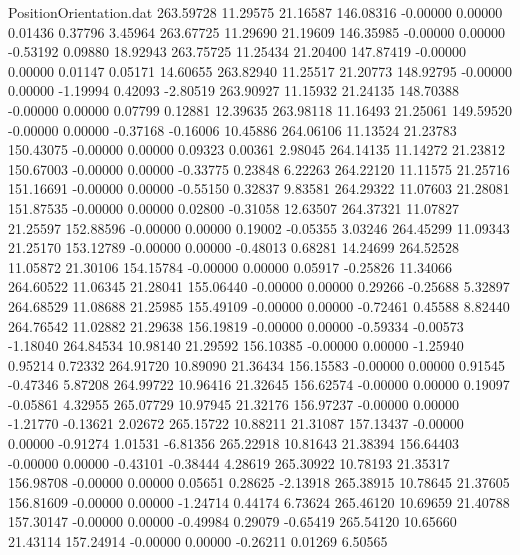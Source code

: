 \begin{filecontents}{PositionOrientation.dat}
 263.59728   11.29575   21.16587   146.08316   -0.00000    0.00000    0.01436    0.37796    3.45964
 263.67725   11.29690   21.19609   146.35985   -0.00000    0.00000   -0.53192    0.09880   18.92943
 263.75725   11.25434   21.20400   147.87419   -0.00000    0.00000    0.01147    0.05171   14.60655
 263.82940   11.25517   21.20773   148.92795   -0.00000    0.00000   -1.19994    0.42093   -2.80519
 263.90927   11.15932   21.24135   148.70388   -0.00000    0.00000    0.07799    0.12881   12.39635
 263.98118   11.16493   21.25061   149.59520   -0.00000    0.00000   -0.37168   -0.16006   10.45886
 264.06106   11.13524   21.23783   150.43075   -0.00000    0.00000    0.09323    0.00361    2.98045
 264.14135   11.14272   21.23812   150.67003   -0.00000    0.00000   -0.33775    0.23848    6.22263
 264.22120   11.11575   21.25716   151.16691   -0.00000    0.00000   -0.55150    0.32837    9.83581
 264.29322   11.07603   21.28081   151.87535   -0.00000    0.00000    0.02800   -0.31058   12.63507
 264.37321   11.07827   21.25597   152.88596   -0.00000    0.00000    0.19002   -0.05355    3.03246
 264.45299   11.09343   21.25170   153.12789   -0.00000    0.00000   -0.48013    0.68281   14.24699
 264.52528   11.05872   21.30106   154.15784   -0.00000    0.00000    0.05917   -0.25826   11.34066
 264.60522   11.06345   21.28041   155.06440   -0.00000    0.00000    0.29266   -0.25688    5.32897
 264.68529   11.08688   21.25985   155.49109   -0.00000    0.00000   -0.72461    0.45588    8.82440
 264.76542   11.02882   21.29638   156.19819   -0.00000    0.00000   -0.59334   -0.00573   -1.18040
 264.84534   10.98140   21.29592   156.10385   -0.00000    0.00000   -1.25940    0.95214    0.72332
 264.91720   10.89090   21.36434   156.15583   -0.00000    0.00000    0.91545   -0.47346    5.87208
 264.99722   10.96416   21.32645   156.62574   -0.00000    0.00000    0.19097   -0.05861    4.32955
 265.07729   10.97945   21.32176   156.97237   -0.00000    0.00000   -1.21770   -0.13621    2.02672
 265.15722   10.88211   21.31087   157.13437   -0.00000    0.00000   -0.91274    1.01531   -6.81356
 265.22918   10.81643   21.38394   156.64403   -0.00000    0.00000   -0.43101   -0.38444    4.28619
 265.30922   10.78193   21.35317   156.98708   -0.00000    0.00000    0.05651    0.28625   -2.13918
 265.38915   10.78645   21.37605   156.81609   -0.00000    0.00000   -1.24714    0.44174    6.73624
 265.46120   10.69659   21.40788   157.30147   -0.00000    0.00000   -0.49984    0.29079   -0.65419
 265.54120   10.65660   21.43114   157.24914   -0.00000    0.00000   -0.26211    0.01269    6.50565

\end{filecontents}
